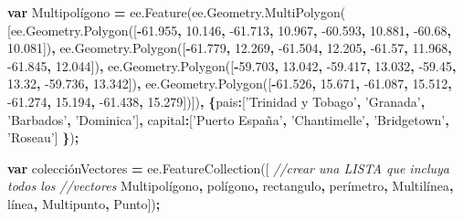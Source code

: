 \documentclass[
]{article}
\newenvironment{Shaded}{\begin{snugshade}}{\end{snugshade}}
\newcommand{\AttributeTok}[1]{\textcolor[rgb]{0.77,0.63,0.00}{#1}}
\newcommand{\CommentTok}[1]{\textcolor[rgb]{0.56,0.35,0.01}{\textit{#1}}}
\newcommand{\DataTypeTok}[1]{\textcolor[rgb]{0.13,0.29,0.53}{#1}}
\newcommand{\FloatTok}[1]{\textcolor[rgb]{0.00,0.00,0.81}{#1}}
\newcommand{\KeywordTok}[1]{\textcolor[rgb]{0.13,0.29,0.53}{\textbf{#1}}}
\newcommand{\NormalTok}[1]{#1}
\newcommand{\OperatorTok}[1]{\textcolor[rgb]{0.81,0.36,0.00}{\textbf{#1}}}
\newcommand{\StringTok}[1]{\textcolor[rgb]{0.31,0.60,0.02}{#1}}
\newcommand{\VariableTok}[1]{\textcolor[rgb]{0.00,0.00,0.00}{#1}}
\begin{document}
\begin{Shaded}
\begin{Highlighting}[]
\KeywordTok{var}\NormalTok{ Multipolígono }\OperatorTok{=} \VariableTok{ee}\NormalTok{.}\AttributeTok{Feature}\NormalTok{(}\VariableTok{ee}\NormalTok{.}\VariableTok{Geometry}\NormalTok{.}\AttributeTok{MultiPolygon}\NormalTok{(   }
\NormalTok{  [}\VariableTok{ee}\NormalTok{.}\VariableTok{Geometry}\NormalTok{.}\AttributeTok{Polygon}\NormalTok{([}\OperatorTok{-}\FloatTok{61.955}\OperatorTok{,} \FloatTok{10.146}\OperatorTok{,}         
      \FloatTok{-61.713}\OperatorTok{,} \FloatTok{10.967}\OperatorTok{,}
      \FloatTok{-60.593}\OperatorTok{,} \FloatTok{10.881}\OperatorTok{,}
    \FloatTok{-60.68}\OperatorTok{,} \FloatTok{10.081}\NormalTok{])}\OperatorTok{,}
    \VariableTok{ee}\NormalTok{.}\VariableTok{Geometry}\NormalTok{.}\AttributeTok{Polygon}\NormalTok{([}\OperatorTok{-}\FloatTok{61.779}\OperatorTok{,} \FloatTok{12.269}\OperatorTok{,}     
      \FloatTok{-61.504}\OperatorTok{,} \FloatTok{12.205}\OperatorTok{,}
      \FloatTok{-61.57}\OperatorTok{,} \FloatTok{11.968}\OperatorTok{,}
      \FloatTok{-61.845}\OperatorTok{,} \FloatTok{12.044}\NormalTok{])}\OperatorTok{,}
    \VariableTok{ee}\NormalTok{.}\VariableTok{Geometry}\NormalTok{.}\AttributeTok{Polygon}\NormalTok{([}\OperatorTok{-}\FloatTok{59.703}\OperatorTok{,} \FloatTok{13.042}\OperatorTok{,}         
      \FloatTok{-59.417}\OperatorTok{,} \FloatTok{13.032}\OperatorTok{,}
      \FloatTok{-59.45}\OperatorTok{,} \FloatTok{13.32}\OperatorTok{,}
      \FloatTok{-59.736}\OperatorTok{,} \FloatTok{13.342}\NormalTok{])}\OperatorTok{,}
    \VariableTok{ee}\NormalTok{.}\VariableTok{Geometry}\NormalTok{.}\AttributeTok{Polygon}\NormalTok{([}\OperatorTok{-}\FloatTok{61.526}\OperatorTok{,} \FloatTok{15.671}\OperatorTok{,}          
      \FloatTok{-61.087}\OperatorTok{,} \FloatTok{15.512}\OperatorTok{,}
      \FloatTok{-61.274}\OperatorTok{,} \FloatTok{15.194}\OperatorTok{,}
      \FloatTok{-61.438}\OperatorTok{,} \FloatTok{15.279}\NormalTok{])])}\OperatorTok{,}
    \OperatorTok{\{}\DataTypeTok{pais}\OperatorTok{:}\NormalTok{[}\StringTok{'Trinidad y Tobago'}\OperatorTok{,}
    \StringTok{'Granada'}\OperatorTok{,}
    \StringTok{'Barbados'}\OperatorTok{,}
    \StringTok{'Dominica'}\NormalTok{]}\OperatorTok{,}
    \DataTypeTok{capital}\OperatorTok{:}\NormalTok{[}\StringTok{'Puerto España'}\OperatorTok{,}
    \StringTok{'Chantimelle'}\OperatorTok{,}
    \StringTok{'Bridgetown'}\OperatorTok{,}
    \StringTok{'Roseau'}\NormalTok{]}
    \OperatorTok{\}}\NormalTok{)}\OperatorTok{;}


\KeywordTok{var}\NormalTok{ colecciónVectores }\OperatorTok{=} \VariableTok{ee}\NormalTok{.}\AttributeTok{FeatureCollection}\NormalTok{([ }\CommentTok{//crear una LISTA que incluya todos los }
\CommentTok{//vectores}
\NormalTok{  Multipolígono}\OperatorTok{,}
\NormalTok{  polígono}\OperatorTok{,}
\NormalTok{  rectangulo}\OperatorTok{,}
\NormalTok{  perímetro}\OperatorTok{,}
\NormalTok{  Multilínea}\OperatorTok{,}
\NormalTok{  línea}\OperatorTok{,}
\NormalTok{  Multipunto}\OperatorTok{,}
\NormalTok{  Punto])}\OperatorTok{;}
\end{Highlighting}
\end{Shaded}
\end{document}
